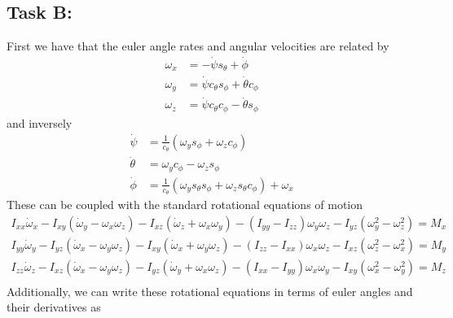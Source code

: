 \documentclass[a4paper]{article}
\begin{document}
\subsection*{Task B:}%
First we have that the euler angle rates and angular velocities are related by
\[
  \begin{aligned}
    \omega_x &= - \dot{\psi} s_{\theta} + \dot{\phi} \\
    \omega_y &= \dot{\psi} c_{\theta}s_{\phi} + \dot{\theta} c_{\phi} \\
    \omega_z &= \dot{\psi}c_{\theta}c_{\phi} - \dot{\theta}s_{\phi}
  \end{aligned}
\]
and inversely
\[
  \begin{aligned}
    \dot{\psi} &= \frac{1}{c_{\theta}} \left( \omega_y s_{\phi} + \omega_z c_{\phi} \right) \\
    \dot{\theta} &= \omega_y c_{\phi} - \omega_z s_{\phi} \\
    \dot{\phi} &= \frac{1}{c_{\theta}} \left( \omega_y s_{\theta} s_{\phi} + \omega_z s_{\theta}c_{\phi} \right) + \omega_x
  \end{aligned}
\]
These can be coupled with the standard rotational equations of motion
\[
  \begin{aligned}
  I_{xx} \dot{\omega}_x - I_{xy} \left( \dot{\omega}_y - \omega_x \omega_z\right) - I_{xz}(\dot{\omega}_z + \omega_x \omega_y) - (I_{yy} - I_{zz})\omega_y \omega_z - I_{yz} (\omega_y^2 - \omega_z^2) = M_x \\
  I_{yy} \dot{\omega}_y - I_{yz} \left( \dot{\omega}_x - \omega_y \omega_z\right) - I_{xy}(\dot{\omega}_x + \omega_y \omega_z) - (I_{zz} - I_{xx})\omega_x \omega_z - I_{xz} (\omega_z^2 - \omega_x^2) = M_y \\
  I_{zz} \dot{\omega}_z - I_{xz} \left( \dot{\omega}_x - \omega_y \omega_z\right) - I_{yz}(\dot{\omega}_y + \omega_x \omega_z) - (I_{xx} - I_{yy})\omega_x \omega_y - I_{xy} (\omega_x^2 - \omega_y^2) = M_z \\
  \end{aligned}
\]
Additionally, we can write these rotational equations in terms of euler angles and their derivatives as
\end{document}
